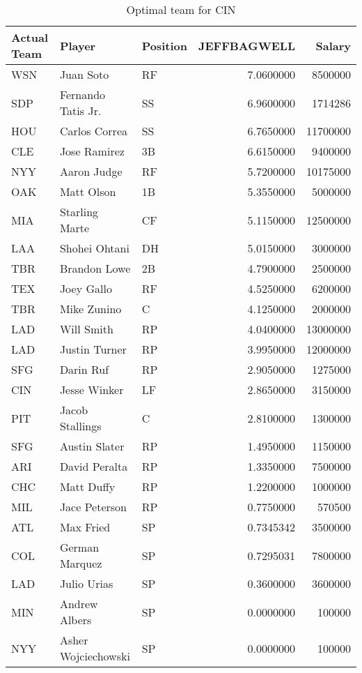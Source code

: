 \begin{table}

\caption{Optimal team for CIN}
\centering
\begin{tabular}[t]{l|l|l|r|r}
\hline
Actual Team & Player & Position & JEFFBAGWELL & Salary\\
\hline
WSN & Juan Soto & RF & 7.0600000 & 8500000\\
\hline
SDP & Fernando Tatis Jr. & SS & 6.9600000 & 1714286\\
\hline
HOU & Carlos Correa & SS & 6.7650000 & 11700000\\
\hline
CLE & Jose Ramirez & 3B & 6.6150000 & 9400000\\
\hline
NYY & Aaron Judge & RF & 5.7200000 & 10175000\\
\hline
OAK & Matt Olson & 1B & 5.3550000 & 5000000\\
\hline
MIA & Starling Marte & CF & 5.1150000 & 12500000\\
\hline
LAA & Shohei Ohtani & DH & 5.0150000 & 3000000\\
\hline
TBR & Brandon Lowe & 2B & 4.7900000 & 2500000\\
\hline
TEX & Joey Gallo & RF & 4.5250000 & 6200000\\
\hline
TBR & Mike Zunino & C & 4.1250000 & 2000000\\
\hline
LAD & Will Smith & RP & 4.0400000 & 13000000\\
\hline
LAD & Justin Turner & RP & 3.9950000 & 12000000\\
\hline
SFG & Darin Ruf & RP & 2.9050000 & 1275000\\
\hline
CIN & Jesse Winker & LF & 2.8650000 & 3150000\\
\hline
PIT & Jacob Stallings & C & 2.8100000 & 1300000\\
\hline
SFG & Austin Slater & RP & 1.4950000 & 1150000\\
\hline
ARI & David Peralta & RP & 1.3350000 & 7500000\\
\hline
CHC & Matt Duffy & RP & 1.2200000 & 1000000\\
\hline
MIL & Jace Peterson & RP & 0.7750000 & 570500\\
\hline
ATL & Max Fried & SP & 0.7345342 & 3500000\\
\hline
COL & German Marquez & SP & 0.7295031 & 7800000\\
\hline
LAD & Julio Urias & SP & 0.3600000 & 3600000\\
\hline
MIN & Andrew Albers & SP & 0.0000000 & 100000\\
\hline
NYY & Asher Wojciechowski & SP & 0.0000000 & 100000\\
\hline
\end{tabular}
\end{table}
